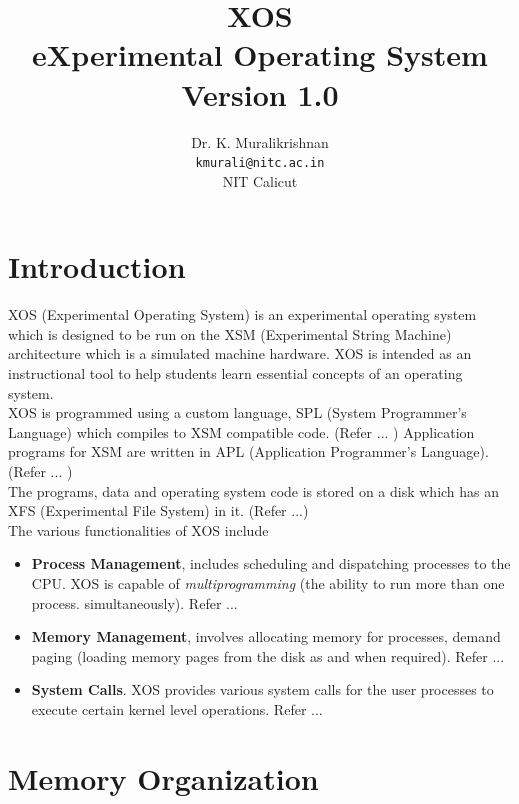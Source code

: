 \documentclass[10pt]{report}
\title{XOS \\ eXperimental Operating System \\
Version 1.0}
\author{Dr. K. Muralikrishnan  \\ \texttt{kmurali@nitc.ac.in} \\ {NIT Calicut} }
\begin{document}
\maketitle
\pagebreak

\thispagestyle{plain}

\tableofcontents
\pagebreak

\chapter{Introduction}
\label{chp:osintro}

XOS (Experimental Operating System) is an experimental operating system  which is designed to be run on the  XSM  (Experimental String Machine) architecture which is a simulated machine hardware. XOS is intended as an instructional tool to help students learn essential concepts of an operating system. 
\vspace{0.1in} \\
XOS is programmed using a custom language, SPL (System Programmer's Language) which compiles to XSM compatible code. (Refer ... ) Application programs for XSM are written in APL (Application Programmer's Language). (Refer ... ) 
\vspace{0.1in} \\
The programs, data and operating system code is stored on a disk which has an XFS (Experimental File System) in it. (Refer ...)\\

The various functionalities of XOS include
\begin{itemize}
\item \textbf{Process Management}, includes scheduling and dispatching processes to the CPU. XOS is capable of \textit{multiprogramming} (the ability to run more than one process.  simultaneously). Refer ...
\item \textbf{Memory Management}, involves allocating memory for processes, demand paging (loading memory pages from the disk as and when required). Refer ...
\item \textbf{System Calls}. XOS provides various system calls for the user processes to execute certain kernel level operations. Refer ...
\end{itemize} 


\chapter{Memory Organization}
\label{chp:memoryorg}
\end{document}
